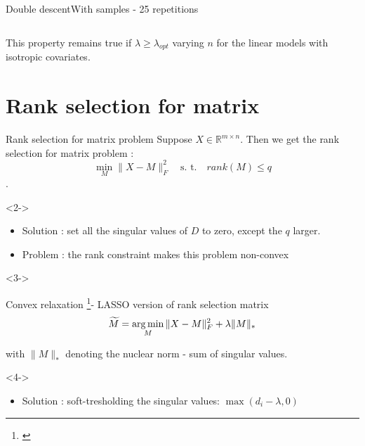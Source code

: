 \documentclass[10pt,aspectratio=43]{beamer}
\begin{document}
\begin{frame}{Double descent}{With samples \citep{nakkiran2020optimal} - 25 repetitions}
\begin{columns}
\begin{column}{0.7\textwidth}
\begin{center}
             \end{center}
        \end{column}
        \end{columns}
        \begin{block}{}
        This property remains true if $\lambda \geq \lambda_{opt}$ varying $n$ for the linear models with isotropic covariates.
        \end{block}
\end{frame}

\section{Rank selection for matrix}
\begin{frame}{Rank selection for matrix problem}{}
    Suppose $X \in \mathbb{R}^{m\times n }$. Then we get the rank selection for matrix problem :
    $$\min_{M} \|X-M\|_F^2 \quad \text{s. t.} \quad  rank(M) \leq q$$.
    \begin{onlyenv}<2->
    \begin{itemize}
        \item Solution : set all the singular values of $D$ to zero, except the $q$ larger.
        \item Problem : the rank constraint makes this problem non-convex
    \end{itemize}
    \end{onlyenv}
    \begin{onlyenv}<3->
        \begin{block}{Convex relaxation \footnote[frame]{\citet{Fazel02}}- LASSO version of rank selection matrix}
            $$\widetilde{M} = \mathop{\mathrm{arg\,min}}_{M} \|X-M\|_F^2 + \lambda \|M\|_*$$
            \begin{center}
                with $\|M\|_*$ denoting the nuclear norm - sum of singular values.
            \end{center}
        \end{block}
    \end{onlyenv}
    \begin{onlyenv}<4->
        \begin{itemize}
            \item Solution : soft-tresholding the singular values: $\max(d_i  -\lambda, 0)$
        \end{itemize}
        \end{onlyenv}
\end{frame}
\end{document}
